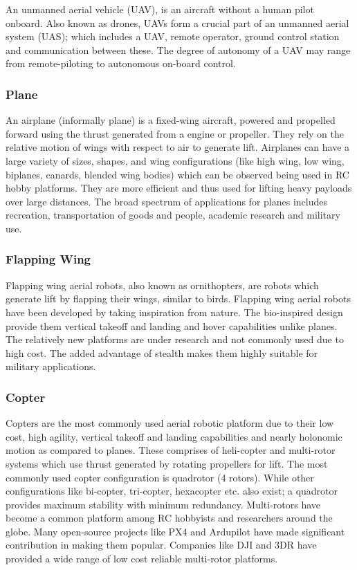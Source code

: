 \begin{spacing}{2}
An unmanned aerial vehicle (UAV), is an aircraft without a human pilot onboard. Also known as drones, UAVs form a crucial part of an unmanned aerial system (UAS); which includes a UAV, remote operator, ground control station and communication between these. The degree of autonomy of a UAV may range from remote-piloting to autonomous on-board control.

\subsubsection*{Plane}
An airplane (informally plane) is a fixed-wing aircraft, powered and propelled forward using the thrust generated from a engine or propeller. They rely on the relative motion of wings with respect to air to generate lift. Airplanes can have a large variety of sizes, shapes, and wing configurations (like high wing, low wing, biplanes, canards, blended wing bodies) which can be observed being used in RC hobby platforms. They are more efficient and thus used for lifting heavy payloads over large distances. The broad spectrum of applications for planes includes recreation, transportation of goods and people, academic research and military use.

\subsubsection*{Flapping Wing}
Flapping wing aerial robots, also known as ornithopters, are robots which generate lift by flapping their wings, similar to birds. Flapping wing aerial robots have been developed by taking inspiration from nature. The bio-inspired design provide them vertical takeoff and landing and hover capabilities unlike planes. The relatively new platforms are under research and not commonly used due to high cost. The added advantage of stealth makes them highly suitable for military applications.  

\subsubsection*{Copter}
Copters are the most commonly used aerial robotic platform due to their low cost, high agility, vertical takeoff and landing capabilities and nearly holonomic motion as compared to planes. These comprises of heli-copter and multi-rotor systems which use thrust generated by rotating propellers for lift. The most commonly used copter configuration is quadrotor (4 rotors). While other configurations like bi-copter, tri-copter, hexacopter etc. also exist; a quadrotor provides maximum stability with minimum redundancy.
Multi-rotors have become a common platform among RC hobbyists and researchers around the globe. Many open-source projects like PX4 and Ardupilot have made significant contribution in making them popular. Companies like DJI and 3DR have provided a wide range of low cost reliable multi-rotor platforms.


\end{spacing}
